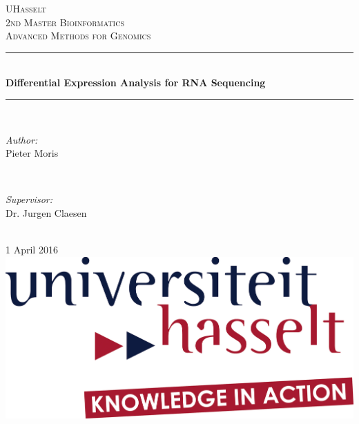 \documentclass[a4paper,10pt]{article}\usepackage[]{graphicx}\usepackage[]{color}
\begin{document}
\begin{titlepage}
	\newcommand{\HRule}{\rule{\linewidth}{0.5mm}} %
	\centering %
		\textsc{\LARGE UHasselt}\\[1.5cm] %
	\textsc{\Large 2nd Master Bioinformatics}\\[0.5cm] %
	\textsc{\large Advanced Methods for Genomics}\\[0.5cm] %
	\HRule \\[0.4cm]
	{ \huge \bfseries Differential Expression Analysis for RNA Sequencing}\\[0.4cm] %
	\HRule \\[1.5cm]
	\begin{minipage}{0.4\textwidth}
		\begin{flushleft} \large
			\emph{Author:}\\
			Pieter Moris %
		\end{flushleft}
	\end{minipage}
	~
	\begin{minipage}{0.4\textwidth}
		\begin{flushright} \large
			\emph{Supervisor:} \\
			Dr. Jurgen Claesen %
		\end{flushright}
	\end{minipage}\\[2cm]
	{\large 1 April 2016}\\[2cm] %
	\includegraphics[width=0.3\linewidth]{logo.jpg}\\[1cm] 
	\vfill %
\end{titlepage}

\tableofcontents
\pagebreak
\clearpage
{}
\end{document}
